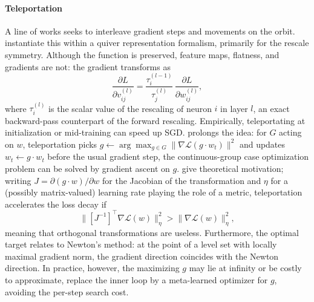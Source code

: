 \documentclass[mathematics,review,submit,moreauthors]{Definitions/mdpi}
\begin{document}
\paragraph{Teleportation}
A line of works seeks to interleave gradient steps and movements on the orbit.
\citet{armenta2021b} instantiate this within a quiver representation formalism\citep{armenta2021a}, primarily for the rescale symmetry.
Although the function is preserved, feature maps, flatness, and gradients are not: the gradient transforms as
\begin{equation*}
    \frac{\partial L}{\partial v^{(l)}_{ij}}=\frac{\tau^{(l-1)}_i}{\tau^{(l)}_j}\,\frac{\partial L}{\partial w^{(l)}_{ij}},
\end{equation*}
where $\tau^{(l)}_i$ is the scalar value of the rescaling of neuron $i$ in layer $l$, an exact backward-pass counterpart of the forward rescaling.
Empirically, teleportating at initialization or mid-training can speed up SGD.
\citet{zhao2023} prolongs the idea: for $G$ acting on $w$, teleportation picks $g\leftarrow\arg\max_{g\in G}\lVert\nabla\mathcal{L}(g\cdot w_t)\rVert^2$ and updates $w_t\leftarrow g\cdot w_t$ before the usual gradient step, the continuous-group case optimization problem can be solved by gradient ascent on $g$.
\citet{zhao2023} give theoretical motivation; writing $J=\partial(g\cdot w)/\partial w$ for the Jacobian of the transformation and $\eta$ for a (possibly matrix-valued) learning rate playing the role of a metric, teleportation accelerates the loss decay if
\begin{equation*}
    \big\lVert[J^{-1}]^{\top}\nabla\mathcal{L}(w)\big\rVert_{\eta}^2>\big\lVert\nabla\mathcal{L}(w)\big\rVert_{\eta}^2,
\end{equation*}
meaning that orthogonal transformations are useless.
Furthermore, the optimal target relates to Newton's method: at the point of a level set with locally maximal gradient norm, the gradient direction coincides with the Newton direction.
In practice, however, the maximizing $g$ may lie at infinity or be costly to approximate, \citet{zhao2024} replace the inner loop by a meta-learned optimizer for $g$, avoiding the per-step search cost.
\end{document}
